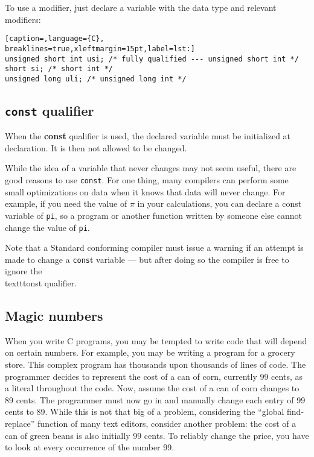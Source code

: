 To use a modifier, just declare a variable with the data type and relevant modifiers:
\lstset{basicstyle=\scriptsize, numbers=left, captionpos=b, tabsize=4}
\begin{lstlisting}[caption=,language={C},
breaklines=true,xleftmargin=15pt,label=lst:]
unsigned short int usi; /* fully qualified --- unsigned short int */
short si; /* short int */
unsigned long uli; /* unsigned long int */
\end{lstlisting}

\subsection{\texttt{const} qualifier}
When the \textbf{const} qualifier is used, the declared variable must be
initialized at declaration. It is then not allowed to be changed.

While the idea of a variable that never changes may not seem useful, there are
good reasons to use \texttt{const}. For one thing, many compilers can perform
some small optimizations on data when it knows that data will never change. For
example, if you need the value of \ensuremath{\pi} in your calculations, you
can declare a const variable of \texttt{pi}, so a program or another function
written by someone else cannot change the value of \texttt{pi}.

Note that a Standard conforming compiler must issue a warning if an attempt is
made to change a \texttt{cons}t variable --- but after doing so the compiler is
free to ignore the \\texttt{onst} qualifier.

\subsection{Magic numbers}
When you write C programs, you may be tempted to write code that will depend on
certain numbers. For example, you may be writing a program for a grocery store.
This complex program has thousands upon thousands of lines of code. The
programmer decides to represent the cost of a can of corn, currently 99 cents,
as a literal throughout the code. Now, assume the cost of a can of corn changes
to 89 cents. The programmer must now go in and manually change each entry of 99
cents to 89. While this is not that big of a problem, considering the ``global
find-replace'' function of many text editors, consider another problem: the
cost of a can of green beans is also initially 99 cents. To reliably change the
price, you have to look at every occurrence of the number 99.

